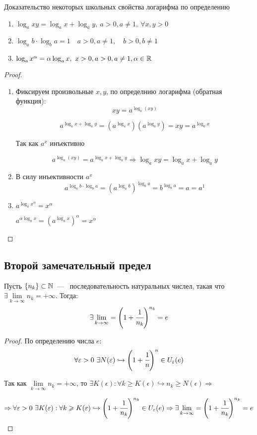 \begin{theorem} 
Доказательство некоторых школьных свойства логарифма по определению
\begin{enumerate}
    \item $\log_a xy = \log_a x + \log_a y, \ a > 0, a \neq 1, \ \forall x,y > 0$
    \item $\log_{a} b \cdot \log_{b} a = 1 \quad a > 0, a \neq 1, \quad b> 0, b\neq 1$
    \item $\log_{a} x^{\alpha} = \alpha \log_{a} x, \ x > 0, a> 0, a\neq 1, \alpha \in \R$
\end{enumerate}
\end{theorem}

\begin{proof}  

\begin{enumerate}
    \item Фиксируем произвольные $x, y$, по определнию логарифма (обратная функция):
    $$xy = a^{\log_{a}(xy)}$$

    $$a^{ \log_a x + \log_a y } = (a^{ \log_a x})(a^{ \log_a y}) = xy = a^{ \log_a x}$$

    Так как $a^{x}$ инъективно
    
    $$a^{\log_{a}(xy)} = a^{\log_{a} x + \log_{a} y} \Rightarrow \log_{a} xy = \log_{a} x + \log_{a} y$$
    \item В силу инъективности $a^{x}$
    $$a^{\log_{a}b \cdot \log_{b} a} = \left( a^{\log_{a} b}\right)^{\log_{b} a} = b^{\log_{b} a} = a = a^{1}$$
    \item  $a^{\log_{a} x^{\alpha}} = x^{\alpha}$
    
    $
        a^{\alpha \log_{a} x} =\left(a^{\log_{a} x}\right)^{\alpha} = x^{\alpha}
    $
\end{enumerate}
\end{proof}

\subsection{Второй замечательный предел}
\begin{lemma}
     Пусть $\{n_{k}\}\subset \N$~---~ последовательность натуральных числел, такая что $\exists \lim\limits_{k \to \infty} n_{k} = +\infty$. Тогда:
     $$
     \exists \lim\limits_{k \to \infty} = \left( 1 +\cfrac{1}{n_{k}}\right)^{n_{k}} = e
     $$
\end{lemma}
\begin{proof}
    По определению числа $e$:
    $$
    \forall \epsilon > 0 \ \exists N(\epsilon) \hookrightarrow \left( 1 + \cfrac{1}{n}\right)^{n} \in U_{\epsilon}(e)
    $$

    Так как $\lim\limits_{k \to \infty} n_{k} = +\infty$, то $\exists K(\epsilon): \forall k \geq K(\epsilon) \hookrightarrow n_{k} \geq N(\epsilon) \Rightarrow$

    $$ \Rightarrow\forall \epsilon > 0 \ \exists K(\epsilon): \forall k \geq K(\epsilon) \hookrightarrow \left(1 + \cfrac{1}{n_{k}}\right)^{n_{k}} \in U_{\epsilon}(e) \Rightarrow \exists \lim\limits_{k \to \infty} = \left( 1 +\cfrac{1}{n_{k}}\right)^{n_{k}} = e$$
\end{proof}

